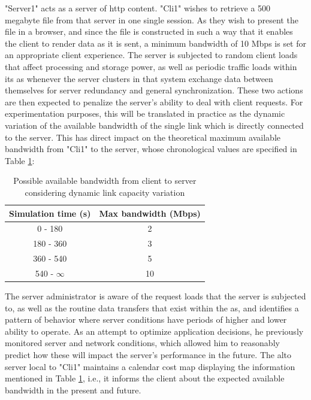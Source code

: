     "Server1" acts as a server of \gls{http} content.
    "Cli1" wishes to retrieve a 500 megabyte file from that server in one single session.
    As they wish to present the file in a browser, and since the file is constructed in such a way that it enables the client to render data as it is sent, a minimum bandwidth of 10 Mbps is set for an appropriate client experience.
    The server is subjected to random client loads that affect processing and storage power, as well as periodic traffic loads within its \gls{as} whenever the server clusters in that system exchange data between themselves for server redundancy and general synchronization.
    These two actions are then expected to penalize the server's ability to deal with client requests.
    For experimentation purposes, this will be translated in practice as the dynamic variation of the available bandwidth of the single link which is directly connected to the server.
    This has direct impact on the theoretical maximum available bandwidth from "Cli1" to the server, whose chronological values are specified in Table \ref{table:server-delays}:

\begin{table}[H]
\centering
\begin{tabular}{|c|c|}
    \hline
    \textbf{Simulation time (s)}  & \textbf{Max bandwidth (Mbps)}  \\ \hline
    0 - 180            & 2                                         \\ \hline
    180 - 360          & 3                                         \\ \hline
    360 - 540          & 5                                         \\ \hline
    540 - $\infty$     & 10                                        \\ \hline
\end{tabular}
\caption{Possible available bandwidth from client to server considering dynamic link capacity variation}
\label{table:server-delays}
\end{table}

    The server administrator is aware of the request loads that the server is subjected to, as well as the routine data transfers that exist within the \gls{as}, and identifies a pattern of behavior where server conditions have periods of higher and lower ability to operate.
    As an attempt to optimize application decisions, he previously monitored server and network conditions, which allowed him to reasonably predict how these will impact the server's performance in the future.
    The \gls{alto} server local to "Cli1" maintains a calendar cost map displaying the information mentioned in Table \ref{table:server-delays}, i.e., it informs the client about the expected available bandwidth in the present and future.


